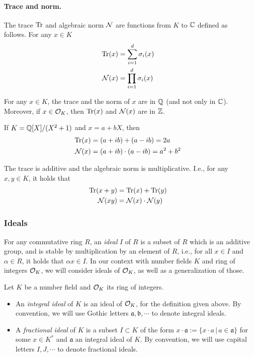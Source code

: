 \paragraph{Trace and norm.} The trace $\mathrm{Tr}$ and algebraic norm $\mathcal{N}$ are functions from $K$ to $\mathbb{C}$ defined as follows. For any $x \in K$
\begin{align*}
\mathrm{Tr}(x) &= \sum_{i = 1}^d \sigma_i(x) \\
\mathcal{N}(x) &= \prod_{i = 1}^d \sigma_i(x)
\end{align*}
\begin{lemma}
For any $x \in K$, the trace and the norm of $x$ are in $\mathbb{Q}$ (and not only in $\mathbb{C}$). Moreover, if $x \in \mathcal{O}_K$, then $\mathrm{Tr}(x)$ and $\mathcal{N}(x)$ are in $\mathbb{Z}$.
\end{lemma}

\begin{example}
If $K = \mathbb{Q}[X]/(X^2+1)$ and $x = a+bX$, then
\begin{align*}
\mathrm{Tr}(x) &= (a+ib) + (a-ib) = 2a \\
\mathcal{N}(x) &= (a+ib) \cdot (a-ib) = a^2+b^2
\end{align*}
\end{example}

\begin{lemma}
The trace is additive and the algebraic norm is multiplicative. I.e., for any $x, y \in K$, it holds that
\begin{align*}
\mathrm{Tr}(x+y) &= \mathrm{Tr}(x) + \mathrm{Tr}(y) \\
\mathcal{N}(xy) &= \mathcal{N}(x) \cdot \mathcal{N}(y)
\end{align*}
\end{lemma}

\subsubsection{Ideals} For any commutative ring $R$, an \emph{ideal} $I$ of $R$ is a subset of $R$ which is an additive group, and is stable by multiplication by an element of $R$, i.e., for all $x \in I$ and $\alpha \in R$, it holds that $\alpha x \in I$. In our context with number fields $K$ and ring of integers $\mathcal{O}_K$, we will consider ideals of $\mathcal{O}_K$, as well as a generalization of those.

\begin{definition}
Let $K$ be a number field and $\mathcal{O}_K$ its ring of integers.
\begin{itemize}
\item An \emph{integral ideal} of $K$ is an ideal of $\mathcal{O}_K$, for the definition given above. By convention, we will use Gothic letters $\mathfrak{a}, \mathfrak{b}, \cdots$ to denote integral ideals.
\item A \emph{fractional ideal} of $K$ is a subset $I \subset K$ of the form $x \cdot \mathfrak{a} := \{x \cdot a\,|\, a \in \mathfrak{a}\}$ for some $x \in K^*$ and $\mathfrak{a}$ an integral ideal of $K$. By convention, we will use capital letters $I, J, \cdots$ to denote fractional ideals.
\end{itemize}
\end{definition}


